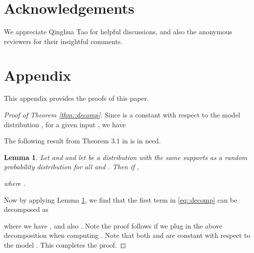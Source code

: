 \documentclass[journal]{IEEEtran}
\newtheorem{lemma}{Lemma}
\begin{document}
\section*{Acknowledgements}
We appreciate Qinghua Tao for helpful discussions, and also the anonymous reviewers for their insightful comments.





\section*{Appendix} \label{sec::app}

This appendix provides the proofs of this paper.
\begin{proof} [Proof of Theorem \ref{thm::decomp}]
Since  is a constant with respect to the model distribution , for a given input , we have

The following result from Theorem 3.1 in \cite{Brofos2019ABD} is in need.
\begin{lemma} \label{lm::decomp}
Let  and  and let  be a distribution with the same supports as a random probability distribution  for all  and . 
Then if ,

where .
\end{lemma}
Now by applying Lemma \ref{lm::decomp}, we find that the first term in \eqref{eq::decomp} can be decomposed as

where we have , and also . 
Note the proof follows if we plug in the above decomposition when computing .
Note that both  and  are constant with respect to the model .
This completes the proof.
\end{proof}
\end{document}
